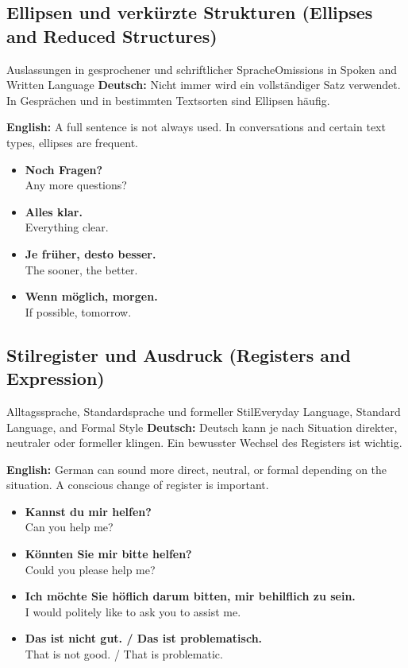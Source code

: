 \documentclass[a4paper,11pt]{article}
\newcommand{\GermanText}[1]{\textbf{Deutsch: }#1\par}
\newcommand{\EnglishText}[1]{{\color{SoftGray}\textbf{English: }#1\par}}
\newcommand{\ExampleItem}[2]{\item \textbf{#1}\\{\color{SoftGray}#2}}
\begin{document}
\subsection{Ellipsen und verkürzte Strukturen {\small (Ellipses and Reduced Structures)}}

\begin{grammarentry}{Auslassungen in gesprochener und schriftlicher Sprache}{Omissions in Spoken and Written Language}
    \GermanText{Nicht immer wird ein vollständiger Satz verwendet. In Gesprächen und in bestimmten Textsorten sind Ellipsen häufig.}
    \EnglishText{A full sentence is not always used. In conversations and certain text types, ellipses are frequent.}
    \begin{exbox}
        \begin{itemize}
            \ExampleItem{Noch Fragen?}{Any more questions?}
            \ExampleItem{Alles klar.}{Everything clear.}
            \ExampleItem{Je früher, desto besser.}{The sooner, the better.}
            \ExampleItem{Wenn möglich, morgen.}{If possible, tomorrow.}
        \end{itemize}
    \end{exbox}
\end{grammarentry}

\subsection{Stilregister und Ausdruck {\small (Registers and Expression)}}

\begin{grammarentry}{Alltagssprache, Standardsprache und formeller Stil}{Everyday Language, Standard Language, and Formal Style}
    \GermanText{Deutsch kann je nach Situation direkter, neutraler oder formeller klingen. Ein bewusster Wechsel des Registers ist wichtig.}
    \EnglishText{German can sound more direct, neutral, or formal depending on the situation. A conscious change of register is important.}
    \begin{exbox}
        \begin{itemize}
            \ExampleItem{Kannst du mir helfen?}{Can you help me?}
            \ExampleItem{Könnten Sie mir bitte helfen?}{Could you please help me?}
            \ExampleItem{Ich möchte Sie höflich darum bitten, mir behilflich zu sein.}{I would politely like to ask you to assist me.}
            \ExampleItem{Das ist nicht gut. / Das ist problematisch.}{That is not good. / That is problematic.}
        \end{itemize}
    \end{exbox}
\end{grammarentry}
\end{document}
